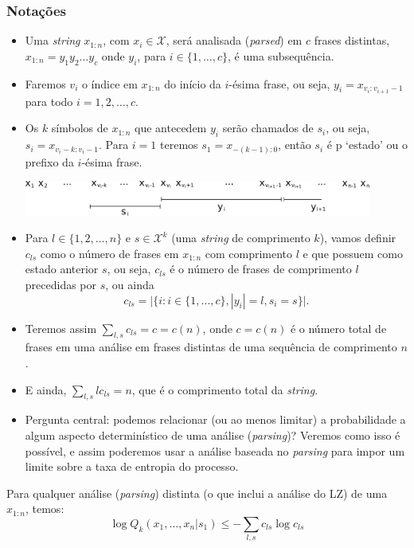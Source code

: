 \begin{frame}[allowframebreaks]
  \frametitle{Notações}
  \begin{itemize}
  \item Uma \textit{string} $x_{1:n}$, com $x_i \in \mathcal{X}$, será analisada (\textit{parsed}) 
	em $c$ frases distintas, $x_{1:n} = y_1 y_2 \ldots y_c$ onde $y_i$, para $i \in \{1, \ldots, c\}$,
	é uma subsequência.
  \item Faremos $v_i$ o índice em $x_{1:n}$ do início da $i$-ésima frase, ou seja,
	$y_i = x_{v_i:v_{i+1}-1}$ para todo $i=1,2,\ldots,c$.
  \item Os $k$ símbolos de $x_{1:n}$ que antecedem $y_i$ serão chamados de $s_i$, ou seja,
	$s_i = x_{v_i-k : v_i - 1}$. Para $i=1$ teremos $s_1 = x_{-(k-1):0}$, então
	$s_i$ é p `estado' ou o prefixo da $i$-ésima frase.
	
	\includegraphics[width=0.9\textwidth]{images/xparse.pdf}
  \item Para $l \in \{1, 2, \ldots, n\}$ e $s \in \mathcal{X}^k$ (uma \textit{string} de comprimento $k$),
	vamos definir $c_{ls}$ como o número de frases em $x_{1:n}$ com comprimento $l$ e que possuem
	como estado anterior $s$, ou seja, $c_{ls}$ é o número de frases de comprimento $l$ precedidas
	por $s$, ou ainda
		\begin{equation}
		c_{ls} = \vert \{ i : i \in \{1, \ldots, c\}, |y_i| = l, s_i = s \} \vert .
		\end{equation}
  \item Teremos assim $\sum_{l,s} c_{ls} = c = c(n)$, onde $c=c(n)$ é o número total de frases
	em uma análise em frases distintas de uma sequência de comprimento $n$.
  \item E ainda, $\sum_{l,s} l c_{ls} = n$, que é o comprimento total da \textit{string}.
  \item Pergunta central: podemos relacionar (ou ao menos limitar) a probabilidade a
	algum aspecto determinístico de uma análise (\textit{parsing})? Veremos como isso é possível,
	e assim poderemos usar a análise baseada no \textit{parsing} para impor um limite sobre a taxa de 
	entropia do processo.
  \end{itemize}

  \begin{lemma}
  Para qualquer análise (\textit{parsing}) distinta (o que inclui a análise do LZ) de uma 
  $x_{1:n}$, temos:
	\begin{equation}
	\log Q_k (x_1, \ldots, x_n | s_1) \leq - \sum_{l,s} c_{ls} \log c_{ls}
	\end{equation}
  \end{lemma}


\end{frame}
